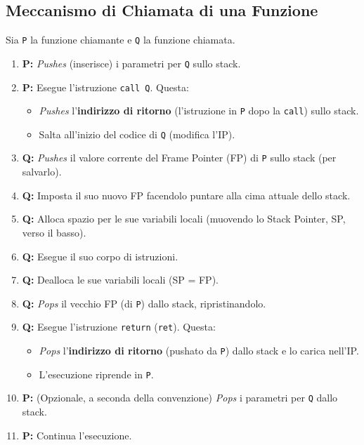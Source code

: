 \subsection{Meccanismo di Chiamata di una Funzione}
Sia \texttt{P} la funzione chiamante e \texttt{Q} la funzione chiamata.
\begin{enumerate}
    \item \textbf{P:} \textit{Pushes} (inserisce) i parametri per \texttt{Q} sullo stack.
    \item \textbf{P:} Esegue l'istruzione \texttt{call Q}. Questa:
        \begin{itemize}
            \item \textit{Pushes} l'\textbf{indirizzo di ritorno} (l'istruzione in \texttt{P} dopo la \texttt{call}) sullo stack.
            \item Salta all'inizio del codice di \texttt{Q} (modifica l'IP).
        \end{itemize}
    \item \textbf{Q:} \textit{Pushes} il valore corrente del Frame Pointer (FP) di \texttt{P} sullo stack (per salvarlo).
    \item \textbf{Q:} Imposta il suo nuovo FP facendolo puntare alla cima attuale dello stack.
    \item \textbf{Q:} Alloca spazio per le sue variabili locali (muovendo lo Stack Pointer, SP, verso il basso).
    \item \textbf{Q:} Esegue il suo corpo di istruzioni.
    \item \textbf{Q:} Dealloca le sue variabili locali (SP = FP).
    \item \textbf{Q:} \textit{Pops} il vecchio FP (di \texttt{P}) dallo stack, ripristinandolo.
    \item \textbf{Q:} Esegue l'istruzione \texttt{return} (\texttt{ret}). Questa:
        \begin{itemize}
            \item \textit{Pops} l'\textbf{indirizzo di ritorno} (pushato da \texttt{P}) dallo stack e lo carica nell'IP.
            \item L'esecuzione riprende in \texttt{P}.
        \end{itemize}
    \item \textbf{P:} (Opzionale, a seconda della convenzione) \textit{Pops} i parametri per \texttt{Q} dallo stack.
    \item \textbf{P:} Continua l'esecuzione.
\end{enumerate}

